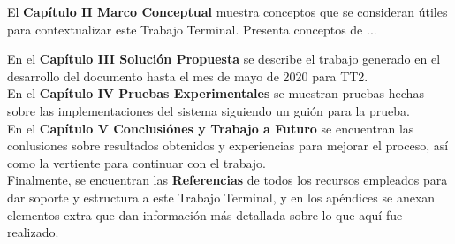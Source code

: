 
El \textbf{Capítulo II Marco Conceptual} muestra conceptos que se consideran útiles
para contextualizar este Trabajo Terminal. Presenta conceptos de ...%

En el \textbf{Capítulo III Soluci\'on Propuesta} se describe el trabajo generado en el desarrollo del documento hasta el mes de mayo de 2020 para TT2.\\
En el \textbf{Capítulo IV Pruebas Experimentales} se muestran pruebas hechas sobre las implementaciones del sistema siguiendo un guión para la prueba.\\ 
En el \textbf{Capítulo V Conclusiónes y Trabajo a Futuro} se encuentran las conlusiones sobre resultados obtenidos y experiencias para mejorar el proceso, así como la vertiente para continuar con el trabajo.\\
Finalmente, se encuentran las \textbf{Referencias} de todos los recursos empleados para dar soporte y estructura a este Trabajo Terminal, y en los apéndices se anexan elementos extra que dan información más detallada sobre lo que aquí fue realizado.\\
